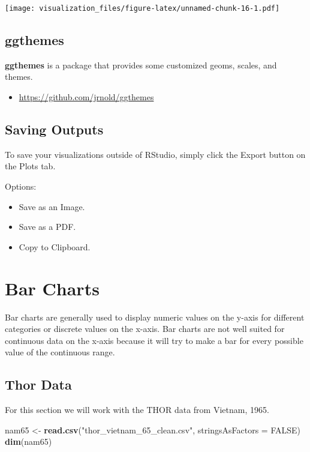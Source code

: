 \documentclass[oneside]{memoir}
\newenvironment{Shaded}{\begin{snugshade}}{\end{snugshade}}
\newcommand{\KeywordTok}[1]{\textcolor[rgb]{0.13,0.29,0.53}{\textbf{#1}}}
\newcommand{\DataTypeTok}[1]{\textcolor[rgb]{0.13,0.29,0.53}{#1}}
\newcommand{\StringTok}[1]{\textcolor[rgb]{0.31,0.60,0.02}{#1}}
\newcommand{\OtherTok}[1]{\textcolor[rgb]{0.56,0.35,0.01}{#1}}
\newcommand{\NormalTok}[1]{#1}
\providecommand{\tightlist}{%
  \setlength{\itemsep}{0pt}\setlength{\parskip}{0pt}}
\theoremstyle{definition}
\theoremstyle{definition}
\theoremstyle{definition}
\theoremstyle{remark}
\begin{document}
\texttt{[image: visualization\_files/figure-latex/unnamed-chunk-16-1.pdf]}

\section{ggthemes}\label{ggthemes}

\textbf{ggthemes} is a package that provides some customized geoms,
scales, and themes.

\begin{itemize}
\tightlist
\item
  \url{https://github.com/jrnold/ggthemes}
\end{itemize}

\section{Saving Outputs}\label{saving-outputs}

To save your visualizations outside of RStudio, simply click the Export
button on the Plots tab.

Options:

\begin{itemize}
\item
  Save as an Image.
\item
  Save as a PDF.
\item
  Copy to Clipboard.
\end{itemize}

\chapter{Bar Charts}\label{bar-charts}

Bar charts are generally used to display numeric values on the y-axis
for different categories or discrete values on the x-axis. Bar charts
are not well suited for continuous data on the x-axis because it will
try to make a bar for every possible value of the continuous range.

\section{Thor Data}\label{thor-data}

For this section we will work with the THOR data from Vietnam, 1965.

\begin{Shaded}
\begin{Highlighting}[]
\NormalTok{nam65 <-}\StringTok{ }\KeywordTok{read.csv}\NormalTok{(}\StringTok{"thor_vietnam_65_clean.csv"}\NormalTok{, }\DataTypeTok{stringsAsFactors =} \OtherTok{FALSE}\NormalTok{)}
\KeywordTok{dim}\NormalTok{(nam65)}
\end{Highlighting}
\end{Shaded}
\end{document}
